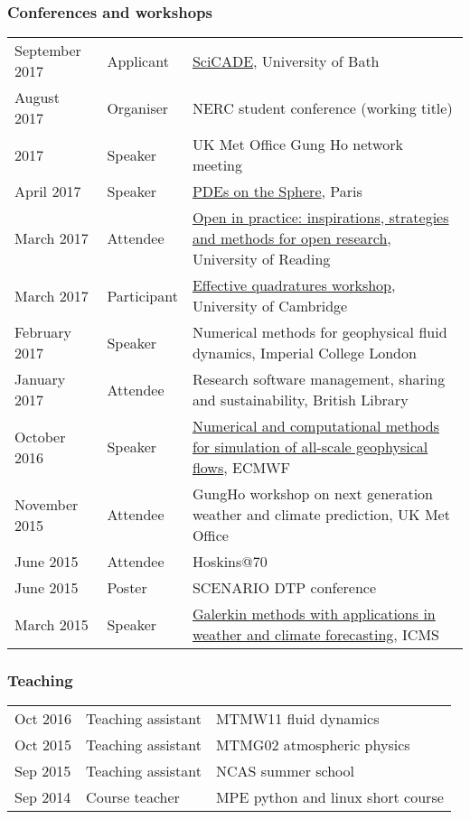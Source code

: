 \documentclass[a4paper,11pt]{article}
\begin{document}
\subsubsection*{Conferences and workshops}
\begin{tabularx}{\linewidth}{l l X}
September 2017 & Applicant & \href{https://sites.google.com/site/scicade2017/}{SciCADE}, University of Bath \\
August 2017 & Organiser & NERC student conference (working title) \\
2017 & Speaker & UK Met Office Gung Ho network meeting \\
April 2017 & Speaker & \href{https://forge.ipsl.jussieu.fr/heat/wiki/PDEs2017}{PDEs on the Sphere}, Paris \\
March 2017 & Attendee & \href{https://blogs.reading.ac.uk/open-research/open-in-practice-inspirations-strategies-and-methods-for-open-research/}{Open in practice: inspirations, strategies and methods for open research}, University of Reading \\
March 2017 & Participant & \href{http://www.effective-quadratures.org/eq2017}{Effective quadratures workshop}, University of Cambridge \\
February 2017 & Speaker & Numerical methods for geophysical fluid dynamics, Imperial College London \\
January 2017 & Attendee & Research software management, sharing and sustainability, British Library \\
October 2016 & Speaker & \href{http://www.ecmwf.int/en/learning/workshops-and-seminars/workshop-numerical-and-computational-methods-simulation-all-scale-geophysical-flows}{Numerical and computational methods for simulation of all-scale geophysical flows}, ECMWF \\
November 2015 & Attendee & GungHo workshop on next generation weather and climate prediction, UK Met Office \\
June 2015 & Attendee & Hoskins@70 \\
June 2015 & Poster & SCENARIO DTP conference \\
March 2015 & Speaker & \href{http://www.icms.org.uk/workshop.php?id=334}{Galerkin methods with applications in weather and climate forecasting}, ICMS \\
\end{tabularx}

\subsubsection*{Teaching}
\begin{tabular}{l l l}
Oct 2016 & Teaching assistant & MTMW11 fluid dynamics \\
Oct 2015 & Teaching assistant & MTMG02 atmospheric physics \\
Sep 2015 & Teaching assistant & NCAS summer school \\
Sep 2014 & Course teacher & MPE python and linux short course \\
\end{tabular}
\end{document}
